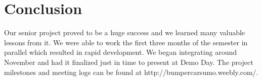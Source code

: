 \documentclass[11pt]{ieeeconf}
\begin{document}
\section{Conclusion}

Our senior project proved to be a huge success and we learned many valuable lessons from it. We were able to work the first three months of the semester in parallel which resulted in rapid development. We began integrating around November and had it finalized just in time to present at Demo Day. The project milestones and meeting logs can be found at http://bumpercarsumo.weebly.com/.



\end{document}

